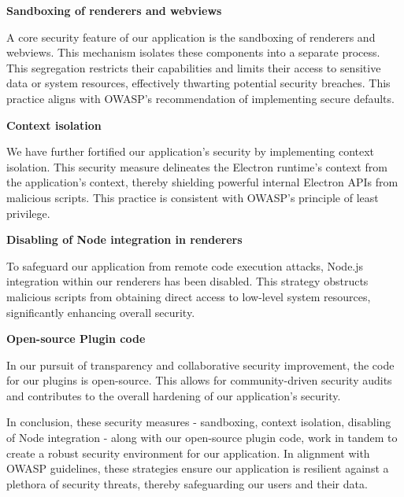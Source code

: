 \documentclass[11pt,a4paper]{article}
\begin{document}
\textbf{Sandboxing of renderers and webviews}

A core security feature of our application is the sandboxing of renderers and
webviews. This mechanism isolates these components into a separate process. This
segregation restricts their capabilities and limits their access to sensitive
data or system resources, effectively thwarting potential security breaches.
This practice aligns with OWASP's recommendation of implementing secure
defaults.

\textbf{Context isolation}

We have further fortified our application's security by implementing context
isolation. This security measure delineates the Electron runtime's context from
the application's context, thereby shielding powerful internal Electron APIs
from malicious scripts. This practice is consistent with OWASP's principle of
least privilege.

\textbf{Disabling of Node integration in renderers}

To safeguard our application from remote code execution attacks, Node.js
integration within our renderers has been disabled. This strategy obstructs
malicious scripts from obtaining direct access to low-level system resources,
significantly enhancing overall security.

\textbf{Open-source Plugin code}

In our pursuit of transparency and collaborative security improvement, the code
for our plugins is open-source. This allows for community-driven security audits
and contributes to the overall hardening of our application's security.

In conclusion, these security measures - sandboxing, context isolation,
disabling of Node integration - along with our open-source plugin code, work in
tandem to create a robust security environment for our application. In alignment
with OWASP guidelines, these strategies ensure our application is resilient
against a plethora of security threats, thereby safeguarding our users and their
data.
\end{document}

